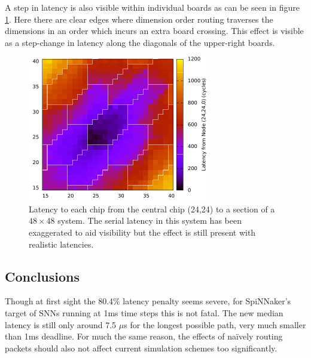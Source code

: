 				A step in latency is also visible within individual boards as can be
				seen in figure \ref{fig:packet-latency-closeup-exaggerated}. Here there
				are clear edges where dimension order routing traverses the dimensions
				in an order which incurs an extra board crossing. This effect is visible
				as a step-change in latency along the diagonals of the upper-right
				boards.
		
				\begin{figure}
					\center
					\includegraphics[width=0.7\textwidth]{figures/packet-latency-closeup-exaggerated.pdf}
					
					\caption[Latency to a subset of chips with exaggerated board-to-board
					latency.]{Latency to each chip from the central chip (24,24) to a
					section of a $48\times{}48$ system. The serial latency in this system
					has been exaggerated to aid visibility but the effect is still present
					with realistic latencies.}
					
					\label{fig:packet-latency-closeup-exaggerated}
				\end{figure}
		
		\subsection{Conclusions}
			
			Though at first sight the 80.4\% latency penalty seems severe, for
			SpiNNaker's target of SNNs running at 1ms time steps this is not fatal.
			The new median latency is still only around 7.5 $\mu$s for the longest
			possible path, very much smaller than 1ms deadline.  For much the same
			reason, the effects of na\"ively routing packets should also not affect
			current simulation schemes too significantly.
			
			
